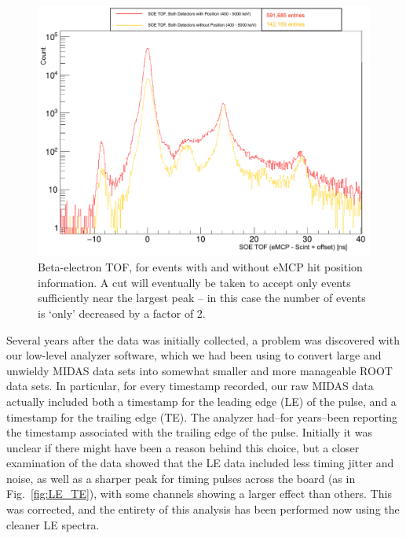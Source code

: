 \begin{figure}[h!!!!t!]
	\centering
	\includegraphics[width=.999\linewidth]
	{Figures/SOE_TOF_positioncompare.pdf}
	\caption{Beta-electron TOF, for events with and without eMCP hit position information.  A cut will eventually be taken to accept only events sufficiently near the largest peak -- in this case the number of events is `only' decreased by a factor of 2.}	
	\label{fig:soe_tof_positioncompare}
	\label{fig:experimental_soe_tof}
\end{figure}

Several years after the data was initially collected, a problem was discovered with our low-level analyzer software, which we had been using to convert large and unwieldy MIDAS data sets into somewhat smaller and more manageable ROOT data sets.  In particular, for every timestamp recorded, our raw MIDAS data actually included both a timestamp for the leading edge (LE) of the pulse, and a timestamp for the trailing edge (TE).  The analyzer had--for years--been reporting the timestamp associated with the trailing edge of the pulse.  Initially it was unclear if there might have been a reason behind this choice, but a closer examination of the data showed that the LE data included less timing jitter and noise, as well as a sharper peak for timing pulses across the board (as in Fig.~\ref{fig:LE_TE}), with some channels showing a larger effect than others.  This was corrected, and the entirety of this analysis has been performed now using the cleaner LE spectra.  

